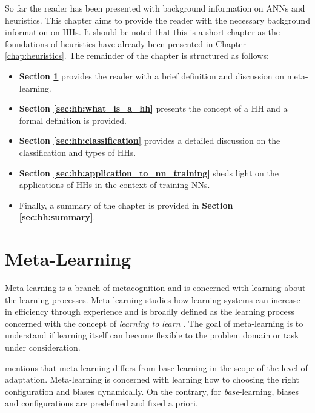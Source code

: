 So far the reader has been presented with background information on \acp{ANN} and heuristics. This chapter aims to provide the reader with the necessary background information on \acp{HH}. It should be noted that this is a short chapter as the foundations of heuristics have already been presented in Chapter \ref{chap:heuristics}. The remainder of the chapter is structured as follows:

\begin{itemize}
    \item \textbf{Section \ref{sec:hh:meta_learning}} provides the reader with a brief definition and discussion on meta-learning.
    
    \item \textbf{Section \ref{sec:hh:what_is_a_hh}} presents the concept of a \ac{HH} and a formal definition is provided.
    
    \item \textbf{Section \ref{sec:hh:classification}} provides a detailed discussion on the classification and types of \acp{HH}.
    
    \item \textbf{Section \ref{sec:hh:application_to_nn_training}} sheds light on the applications of \acp{HH} in the context of training \acp{NN}.
    
    \item Finally, a summary of the chapter is provided in \textbf{Section \ref{sec:hh:summary}}.
\end{itemize}



\section{Meta-Learning}
\label{sec:hh:meta_learning}

Meta learning is a branch of metacognition and is concerned with learning about the learning processes. Meta-learning studies how learning systems can increase in efficiency through experience and is broadly defined as the learning process concerned with the concept of \textit{learning to learn} \cite{ref:vilalta:2002}. The goal of meta-learning is to understand if learning itself can become flexible to the problem domain or task under consideration.

\citeauthor{ref:vilalta:2002} \cite{ref:vilalta:2002} mentions that meta-learning differs from base-learning in the scope of the level of adaptation. Meta-learning is concerned with learning how to choosing the right configuration and biases dynamically. On the contrary, for \textit{base}-learning, biases and configurations are predefined and fixed a priori.


